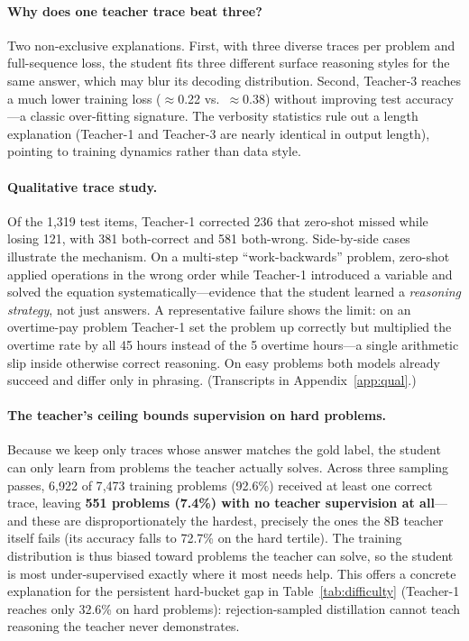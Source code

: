 \documentclass[11pt]{article}
\begin{document}
\paragraph{Why does one teacher trace beat three?} Two non-exclusive explanations.
First, with three diverse traces per problem and full-sequence loss, the student
fits three different surface reasoning styles for the same answer, which may blur
its decoding distribution. Second, Teacher-3 reaches a much lower training loss
($\approx$0.22 vs.\ $\approx$0.38) without improving test accuracy---a classic
over-fitting signature. The verbosity statistics rule out a length explanation
(Teacher-1 and Teacher-3 are nearly identical in output length), pointing to
training dynamics rather than data style.

\paragraph{Qualitative trace study.} Of the 1{,}319 test items, Teacher-1 corrected
236 that zero-shot missed while losing 121, with 381 both-correct and 581
both-wrong. Side-by-side cases illustrate the mechanism. On a multi-step
``work-backwards'' problem, zero-shot applied operations in the wrong order while
Teacher-1 introduced a variable and solved the equation systematically---evidence
that the student learned a \emph{reasoning strategy}, not just answers. A
representative failure shows the limit: on an overtime-pay problem Teacher-1 set the
problem up correctly but multiplied the overtime rate by all 45 hours instead of
the 5 overtime hours---a single arithmetic slip inside otherwise correct reasoning.
On easy problems both models already succeed and differ only in phrasing.
(Transcripts in Appendix~\ref{app:qual}.)

\paragraph{The teacher's ceiling bounds supervision on hard problems.} Because we
keep only traces whose answer matches the gold label, the student can only learn
from problems the teacher actually solves. Across three sampling passes, 6{,}922 of
7{,}473 training problems (92.6\%) received at least one correct trace, leaving
\textbf{551 problems (7.4\%) with no teacher supervision at all}---and these are
disproportionately the hardest, precisely the ones the 8B teacher itself fails
(its accuracy falls to 72.7\% on the hard tertile). The training distribution is
thus biased toward problems the teacher can solve, so the student is most
under-supervised exactly where it most needs help. This offers a concrete
explanation for the persistent hard-bucket gap in Table~\ref{tab:difficulty}
(Teacher-1 reaches only 32.6\% on hard problems): rejection-sampled distillation
cannot teach reasoning the teacher never demonstrates.
\end{document}
